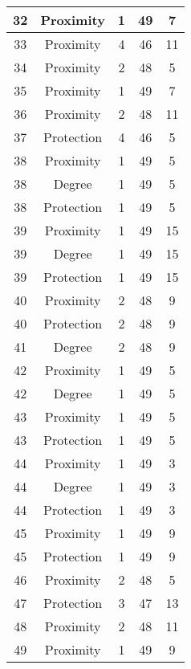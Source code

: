 \documentclass[results.tex]{subfiles}
\begin{document}
\begin{center}
\begin{tabular}{| c || c | c | c | c |}
    \hline
    32 & Proximity & 1 & 49 & 7 \\ 
    \hline
    33 & Proximity & 4 & 46 & 11 \\ 
    \hline
    34 & Proximity & 2 & 48 & 5 \\ 
    \hline
    35 & Proximity & 1 & 49 & 7 \\ 
    \hline
    36 & Proximity & 2 & 48 & 11 \\ 
    \hline
    37 & Protection & 4 & 46 & 5 \\ 
    \hline
    38 & Proximity & 1 & 49 & 5 \\ 
    \hline
    38 & Degree & 1 & 49 & 5 \\ 
    \hline
    38 & Protection & 1 & 49 & 5 \\ 
    \hline
    39 & Proximity & 1 & 49 & 15 \\ 
    \hline
    39 & Degree & 1 & 49 & 15 \\ 
    \hline
    39 & Protection & 1 & 49 & 15 \\ 
    \hline
    40 & Proximity & 2 & 48 & 9 \\ 
    \hline
    40 & Protection & 2 & 48 & 9 \\ 
    \hline
    41 & Degree & 2 & 48 & 9 \\ 
    \hline
    42 & Proximity & 1 & 49 & 5 \\ 
    \hline
    42 & Degree & 1 & 49 & 5 \\ 
    \hline
    43 & Proximity & 1 & 49 & 5 \\ 
    \hline
    43 & Protection & 1 & 49 & 5 \\ 
    \hline
    44 & Proximity & 1 & 49 & 3 \\ 
    \hline
    44 & Degree & 1 & 49 & 3 \\ 
    \hline
    44 & Protection & 1 & 49 & 3 \\ 
    \hline
    45 & Proximity & 1 & 49 & 9 \\ 
    \hline
    45 & Protection & 1 & 49 & 9 \\ 
    \hline
    46 & Proximity & 2 & 48 & 5 \\ 
    \hline
    47 & Protection & 3 & 47 & 13 \\ 
    \hline
    48 & Proximity & 2 & 48 & 11 \\ 
    \hline
    49 & Proximity & 1 & 49 & 9 \\ 
    \hline   \end{tabular}
\end{center}
\end{document}
